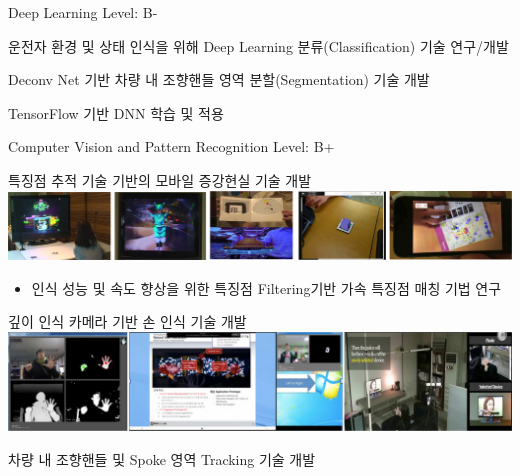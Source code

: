 


\begin{cventries}
  \cventry
    {Deep Learning} %
    {} %
    {} %
    {Level: B-} %
    {
      \begin{cvitems} %
        \item {운전자 환경 및 상태 인식을 위해 Deep Learning 분류(Classification) 기술 연구/개발}
        \item {Deconv Net 기반 차량 내 조향핸들 영역 분할(Segmentation) 기술 개발}
        \item {TensorFlow 기반 DNN 학습 및 적용}
      \end{cvitems}
    }

  \cventry
    {Computer Vision and Pattern Recognition} %
    {} %
    {} %
    {Level: B+} %
    {
      \begin{cvitems} %
        \item {특징점 추적 기술 기반의 모바일 증강현실 기술 개발 \\
               \includegraphics[width=\linewidth]{cv/resources/ar.png} }
          \begin{itemize}
            \item {인식 성능 및 속도 향상을 위한 특징점 Filtering기반 가속 특징점 매칭 기법 연구}
          \end{itemize}
        \item {깊이 인식 카메라 기반 손 인식 기술 개발 \\
               \includegraphics[width=\linewidth]{cv/resources/hand.png} }
        \item {차량 내 조향핸들 및 Spoke 영역 Tracking 기술 개발}
      \end{cvitems}
    }


\end{cventries}

